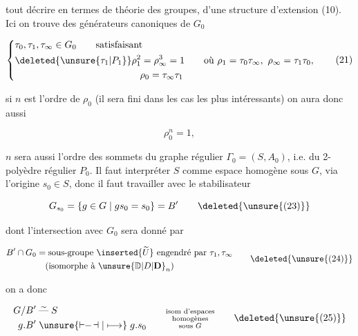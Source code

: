 
tout décrire en termes de théorie des groupes,   d'une structure d'extension (10). Ici on trouve des générateurs canoniques de $G_0$

\[
\left\{\begin{aligned}
 &\tau_0,\tau_1,\tau_\infty\in G_0\qquad\text{satisfaisant}\\
 &\deleted{\unsure{\tau_1|P_1}}\rho_1^{2}=\rho_\infty^3=1\qquad\text{où }\rho_1=\tau_0\tau_\infty,\ \rho_\infty=\tau_1\tau_0,\\
 &\hspace{13em}\rho_0=\tau_\infty\tau_1
\end{aligned}\right.\tag*{(21)}
\]

si $n$ est l'ordre de $\rho_0$ (il sera fini dans les cas les plus intéressants) on aura donc aussi

\[ \rho_0^n=1,\tag*{(22)} \]

$n$ sera aussi l'ordre des sommets du graphe régulier $\Gamma_0=(S,A_0)$, i.e. du 2-polyèdre régulier $P_0$. Il faut interpréter $S$ comme espace homogène sous $G$, via l'origine $s_0\in S$, donc il faut travailler avec le stabilisateur

\[ G_{s_0}=\{g\in G\mid gs_0=s_0\}=B' \tag*{\deleted{\unsure{(23)}}} \]

dont l'intersection avec $G_0$ sera donné par

\[
\begin{aligned}
B'\cap G_0&=\text{sous-groupe }\inserted{\widetilde U}\ \text{engendré}\text{ par }\tau_1,\tau_\infty\\
 &\hspace{1em}\text{(isomorphe à }\unsure{\mathbb D|D|\mathbf D}_n\text{)}
\end{aligned}\tag*{\deleted{\unsure{(24)}}}
\]

on a donc

\[
\begin{aligned}
G/B'&\stackrel{\sim}{\text{---}}S\\
g.B'&\mathrel{\unsure{\vdash\!\!-\!\dashv|\longmapsto}}g.s_0
\end{aligned}\qquad\substack{\text{isom d'espaces}\\\text{homogènes}\\\text{sous }G}\tag*{\deleted{\unsure{(25)}}}
\]

